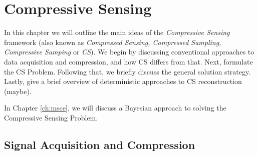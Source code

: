 \chapter{Compressive Sensing}
\label{ch:cs}




In this chapter we will outline the main ideas of the \emph{Compressive Sensing} framework (also known as \emph{Compressed Sensing, Compressed Sampling, Compressive Samping} or \emph{CS}).
We begin by discussing conventional approaches to data acquisition and compression, and how CS differs from that.
Next, formulate the CS Problem.
Following that, we briefly discuss the general solution strategy.
Lastly, give a brief overview of deterministic approaches to CS reconstruction (maybe).

In Chapter \ref{ch:msce}, we will discuss a Bayesian approach to solving the Compressive Sensing Problem.


\section{Signal Acquisition and Compression}
